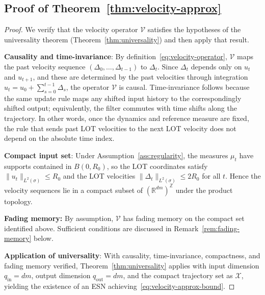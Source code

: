 \documentclass[11pt]{article}
\newcommand{\R}{\mathbb{R}}
\newcommand{\1}{\mathbf{1}}
\begin{document}
\subsection{Proof of Theorem~\ref{thm:velocity-approx}}
\label{app:proof-velocity-approx}
\begin{proof}
We verify that the velocity operator $\mathcal{V}$ satisfies the hypotheses
of the universality theorem (Theorem~\ref{thm:universality}) and then
apply that result.

\textbf{Causality and time-invariance}: By definition~\eqref{eq:velocity-operator}, $\mathcal{V}$ maps the past velocity sequence $(\Delta_0, \ldots, \Delta_{t-1})$ to $\Delta_t$. Since $\Delta_t$ depends only on $u_t$ and $u_{t+1}$, and these are determined by the past velocities through integration $u_t = u_0 + \sum_{s=0}^{t-1} \Delta_s$, the operator $\mathcal{V}$ is causal. Time-invariance follows because the same update rule maps any shifted input history to the correspondingly shifted output; equivalently, the filter commutes with time shifts along the trajectory. In other words, once the dynamics and reference measure are fixed, the rule that sends past LOT velocities to the next LOT velocity does not depend on the absolute time index.

\textbf{Compact input set}:  Under Assumption~\ref{ass:regularity}, the measures $\mu_t$ have supports contained in $B(0,R_0)$, so the LOT coordinates satisfy
$\|u_t\|_{L^2(\sigma)} \leq R_0$ and the LOT velocities $\|\Delta_t\|_{L^2(\sigma)} \leq 2R_0$ for all $t$. Hence the velocity sequences lie in a compact subset of $(\R^{dm})^{\mathbb{Z}}$ under the product topology.

\textbf{Fading memory:} By assumption, $\mathcal{V}$ has fading memory on the compact set identified above. Sufficient conditions are discussed in Remark~\ref{rem:fading-memory} below.


\textbf{Application of universality}: With causality, time-invariance, compactness, and fading memory verified, Theorem~\ref{thm:universality} applies with input dimension $q_{\mathrm{in}} = dm$, output dimension $q_{\mathrm{out}} = dm$, and the compact trajectory set as $\mathcal{X}$, yielding the existence of an ESN achieving~\eqref{eq:velocity-approx-bound}.
\end{proof}
\end{document}
